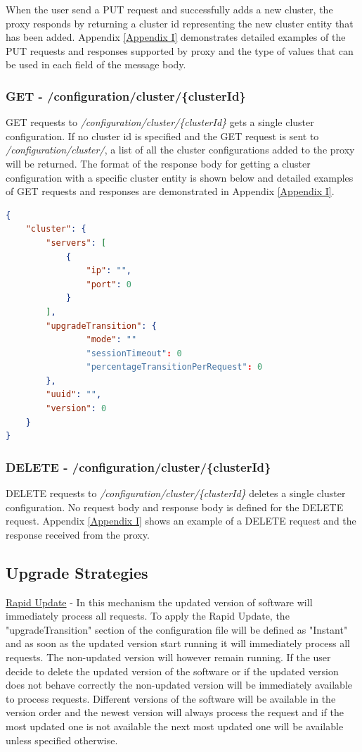 \documentclass[a4paper,11pt,twoside]{article}
\begin{document}
\noindent
When the user send a PUT request and successfully adds a new cluster, the proxy responds by returning a cluster id representing the new cluster entity that has been added. Appendix \ref{Appendix  I} demonstrates detailed examples of the PUT requests and responses supported by proxy and the type of values that can be used in each field of the message body.

\subsubsection{GET - /configuration/cluster/\{clusterId\}} 
GET requests to \textit{/configuration/cluster/\{clusterId\}} gets a single cluster configuration. If no cluster id is specified and the GET request is sent to \textit{/configuration/cluster/}, a list of all the cluster configurations added to the proxy will be returned. The format of the response body for getting a cluster configuration with a specific cluster entity is shown below and detailed examples of GET requests and responses are demonstrated in Appendix \ref{Appendix  I}.\\

\begin{lstlisting}[language=json,firstnumber=1]
{
    "cluster": {
        "servers": [
            {
                "ip": "",
                "port": 0
            }
        ],
        "upgradeTransition": {
                "mode": ""
                "sessionTimeout": 0  
                "percentageTransitionPerRequest": 0  
        },
        "uuid": "",
        "version": 0
    }
}

\end{lstlisting}

\subsubsection{DELETE - /configuration/cluster/\{clusterId\}}
DELETE requests to \textit{/configuration/cluster/\{clusterId\}} deletes a single cluster configuration. No request body and response body is defined for the DELETE request. Appendix \ref{Appendix I} shows an example of a DELETE request and the response received from the proxy.

\subsection{Upgrade Strategies}
\underline{Rapid Update} - In this mechanism the updated version of software will immediately process all requests. To apply the Rapid Update, the "upgradeTransition" section of the configuration file will be defined as "Instant" and as soon as the updated version start running it will immediately process all requests. The non-updated version will however remain running. If the user decide to delete the updated version of the software or if the updated version does not behave correctly the non-updated version will be immediately available to process requests. Different versions of the software will be available in the version order and the newest version will always process the request and if the most updated one is not available the next most updated one will be available unless specified otherwise.  
\end{document}
